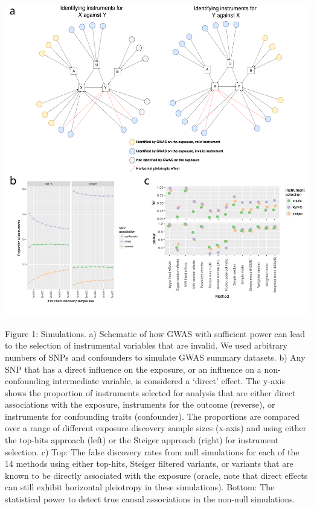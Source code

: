 \documentclass[]{article}
\begin{document}
\includegraphics{images/fig1.pdf}

Figure 1: Simulations. a) Schematic of how GWAS with sufficient power
can lead to the selection of instrumental variables that are invalid. We
used arbitrary numbers of SNPs and confounders to simulate GWAS summary
datasets. b) Any SNP that has a direct influence on the exposure, or an
influence on a non-confounding intermediate variable, is considered a
`direct' effect. The y-axis shows the proportion of instruments selected
for analysis that are either direct associations with the exposure,
instruments for the outcome (reverse), or instruments for confounding
traits (confounder). The proportions are compared over a range of
different exposure discovery sample sizes (x-axis) and using either the
top-hits approach (left) or the Steiger approach (right) for instrument
selection. c) Top: The false discovery rates from null simulations for
each of the 14 methods using either top-hits, Steiger filtered variants,
or variants that are known to be directly associated with the exposure
(oracle, note that direct effects can still exhibit horizontal
pleiotropy in these simulations). Bottom: The statistical power to
detect true causal associations in the non-null simulations.

\newpage
\end{document}
